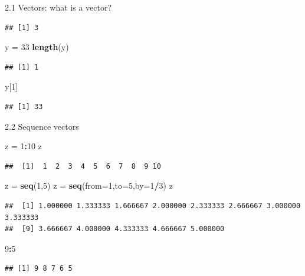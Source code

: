 \documentclass[
  ignorenonframetext,
]{beamer}
\newenvironment{Shaded}{\begin{snugshade}}{\end{snugshade}}
\newcommand{\AttributeTok}[1]{\textcolor[rgb]{0.13,0.29,0.53}{#1}}
\newcommand{\DecValTok}[1]{\textcolor[rgb]{0.00,0.00,0.81}{#1}}
\newcommand{\FunctionTok}[1]{\textcolor[rgb]{0.13,0.29,0.53}{\textbf{#1}}}
\newcommand{\NormalTok}[1]{#1}
\newcommand{\OtherTok}[1]{\textcolor[rgb]{0.56,0.35,0.01}{#1}}
\newcommand{\SpecialCharTok}[1]{\textcolor[rgb]{0.81,0.36,0.00}{\textbf{#1}}}
\begin{document}
\begin{frame}[fragile]{2.1 Vectors: what is a vector?}
\begin{verbatim}
## [1] 3
\end{verbatim}

\begin{Shaded}
\begin{Highlighting}[]
\NormalTok{y }\OtherTok{=} \DecValTok{33}
\FunctionTok{length}\NormalTok{(y)}
\end{Highlighting}
\end{Shaded}

\begin{verbatim}
## [1] 1
\end{verbatim}

\begin{Shaded}
\begin{Highlighting}[]
\NormalTok{y[}\DecValTok{1}\NormalTok{]}
\end{Highlighting}
\end{Shaded}

\begin{verbatim}
## [1] 33
\end{verbatim}
\end{frame}

\begin{frame}[fragile]{2.2 Sequence vectors}
\protect\hypertarget{sequence-vectors}{}
\begin{Shaded}
\begin{Highlighting}[]
\NormalTok{z }\OtherTok{=} \DecValTok{1}\SpecialCharTok{:}\DecValTok{10}
\NormalTok{z}
\end{Highlighting}
\end{Shaded}

\begin{verbatim}
##  [1]  1  2  3  4  5  6  7  8  9 10
\end{verbatim}

\begin{Shaded}
\begin{Highlighting}[]
\NormalTok{z }\OtherTok{=} \FunctionTok{seq}\NormalTok{(}\DecValTok{1}\NormalTok{,}\DecValTok{5}\NormalTok{)}
\NormalTok{z }\OtherTok{=} \FunctionTok{seq}\NormalTok{(}\AttributeTok{from=}\DecValTok{1}\NormalTok{,}\AttributeTok{to=}\DecValTok{5}\NormalTok{,}\AttributeTok{by=}\DecValTok{1}\SpecialCharTok{/}\DecValTok{3}\NormalTok{)}
\NormalTok{z}
\end{Highlighting}
\end{Shaded}

\begin{verbatim}
##  [1] 1.000000 1.333333 1.666667 2.000000 2.333333 2.666667 3.000000 3.333333
##  [9] 3.666667 4.000000 4.333333 4.666667 5.000000
\end{verbatim}

\begin{Shaded}
\begin{Highlighting}[]
\DecValTok{9}\SpecialCharTok{:}\DecValTok{5}
\end{Highlighting}
\end{Shaded}

\begin{verbatim}
## [1] 9 8 7 6 5
\end{verbatim}
\end{frame}
\end{document}
